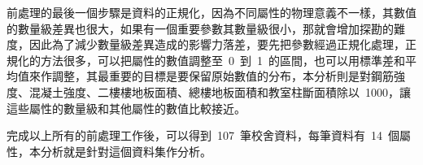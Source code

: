 
前處理的最後一個步驟是資料的正規化，因為不同屬性的物理意義不一樣，其數值的數量級差異也很大，如果有一個重要參數其數量級很小，那就會增加探勘的難度，因此為了減少數量級差異造成的影響力落差，要先把參數經過正規化處理，正規化的方法很多，可以把屬性的數值調整至~0~到~1~的區間，也可以用標準差和平均值來作調整，其最重要的目標是要保留原始數值的分布，本分析則是對鋼筋強度、混凝土強度、二樓樓地板面積、總樓地板面積和教室柱斷面積除以~1000，讓這些屬性的數量級和其他屬性的數值比較接近。


完成以上所有的前處理工作後，可以得到~107~筆校舍資料，每筆資料有~14~個屬性，本分析就是針對這個資料集作分析。


